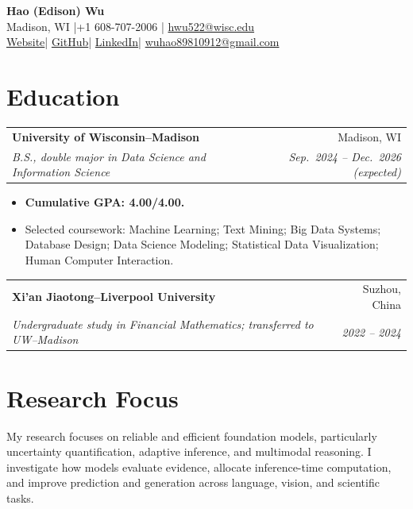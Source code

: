 \documentclass[10pt,a4paper]{article}
\makeatletter
\newcommand{\entry}[4]{%
  \needspace{3\baselineskip}%
  \begin{tabularx}{\linewidth}{@{}Xr@{}}
    \textbf{#1} & #2\\[-1pt]
    \textit{#3} & \textit{#4}
  \end{tabularx}\par
}
\makeatother
\begin{document}
\begin{center}
  {\fontsize{22pt}{25pt}\selectfont\bfseries\color{ink}Hao (Edison) Wu}\\[4pt]
  Madison, WI \quad|\quad +1 608-707-2006 \quad|\quad
  \href{mailto:hwu522@wisc.edu}{hwu522@wisc.edu}\\[2pt]
  \href{https://haowu0916edisonwu.github.io}{Website}\quad|\quad
  \href{https://github.com/haowu0916edisonwu}{GitHub}\quad|\quad
  \href{https://www.linkedin.com/in/hao-edison-wu-33a884324}{LinkedIn}\quad|\quad
  \href{mailto:wuhao89810912@gmail.com}{wuhao89810912@gmail.com}
\end{center}
\vspace{-5pt}

\section{Education}
\entry{University of Wisconsin--Madison}{Madison, WI}
{B.S., double major in Data Science and Information Science}
{Sep.\ 2024 -- Dec.\ 2026 (expected)}
\begin{itemize}
  \item \textbf{Cumulative GPA: 4.00/4.00.}
  \item Selected coursework: Machine Learning; Text Mining; Big Data Systems; Database Design; Data Science Modeling; Statistical Data Visualization; Human Computer Interaction.
\end{itemize}
\vspace{2pt}
\entry{Xi'an Jiaotong--Liverpool University}{Suzhou, China}
{Undergraduate study in Financial Mathematics; transferred to UW--Madison}{2022 -- 2024}

\section{Research Focus}
My research focuses on reliable and efficient foundation models, particularly uncertainty quantification, adaptive inference, and multimodal reasoning. I investigate how models evaluate evidence, allocate inference-time computation, and improve prediction and generation across language, vision, and scientific tasks.
\end{document}
